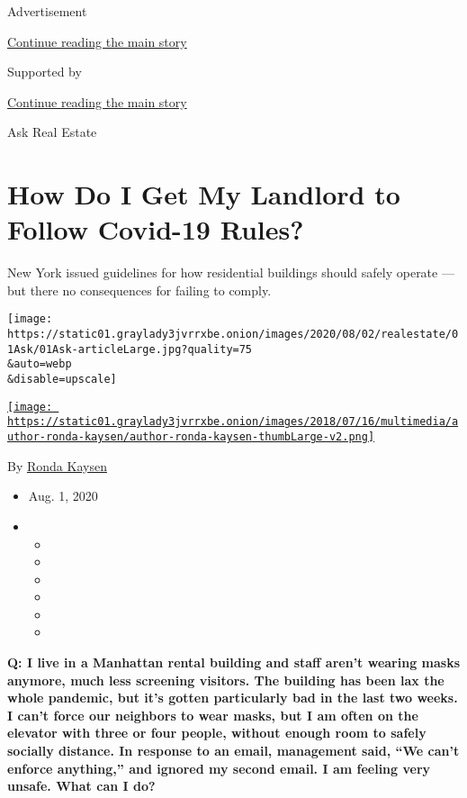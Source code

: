 Advertisement

\protect\hyperlink{after-top}{Continue reading the main story}

Supported by

\protect\hyperlink{after-sponsor}{Continue reading the main story}

Ask Real Estate

\hypertarget{how-do-i-get-my-landlord-to-follow-covid-19-rules}{%
\section{How Do I Get My Landlord to Follow Covid-19
Rules?}\label{how-do-i-get-my-landlord-to-follow-covid-19-rules}}

New York issued guidelines for how residential buildings should safely
operate --- but there no consequences for failing to comply.

\texttt{[image: https://static01.graylady3jvrrxbe.onion/images/2020/08/02/realestate/01Ask/01Ask-articleLarge.jpg?quality=75\\\&auto=webp\\\&disable=upscale]}

\href{https://www.nytimes3xbfgragh.onion/by/ronda-kaysen}{\texttt{[image: https://static01.graylady3jvrrxbe.onion/images/2018/07/16/multimedia/author-ronda-kaysen/author-ronda-kaysen-thumbLarge-v2.png]}}

By \href{https://www.nytimes3xbfgragh.onion/by/ronda-kaysen}{Ronda
Kaysen}

\begin{itemize}
\item
  Aug. 1, 2020
\item
  \begin{itemize}
  \item
  \item
  \item
  \item
  \item
  \item
  \end{itemize}
\end{itemize}

\textbf{Q: I live in a Manhattan rental building and staff aren't
wearing masks anymore, much less screening visitors. The building has
been lax the whole pandemic, but it's gotten particularly bad in the
last two weeks. I can't force our neighbors to wear masks, but I am
often on the elevator with three or four people, without enough room to
safely socially distance. In response to an email, management said, ``We
can't enforce anything,'' and ignored my second email. I am feeling very
unsafe. What can I do?}

